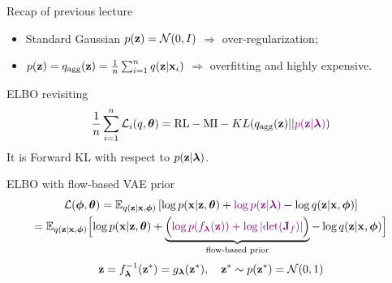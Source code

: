 \begin{frame}{Recap of previous lecture}
	\begin{itemize}
		\item Standard Gaussian $p(\mathbf{z}) = \mathcal{N}(0, I)$ $\Rightarrow$ over-regularization;
		\item $p(\mathbf{z}) = q_{\text{agg}}(\mathbf{z}) = \frac{1}{n}\sum_{i=1}^n q(\mathbf{z} | \mathbf{x}_i)$ $\Rightarrow$ overfitting and highly expensive.
	\end{itemize}
	\begin{block}{ELBO revisiting}
		\vspace{-0.4cm}
		\[
		\frac{1}{n}\sum_{i=1}^n \mathcal{L}_i(q, \boldsymbol{\theta}) = \text{RL} - \text{MI} -  KL(q_{\text{agg}}(\mathbf{z}) || {\color{violet}p(\mathbf{z} | \boldsymbol{\lambda})})
		\]
		It is Forward KL with respect to $p(\mathbf{z} | \boldsymbol{\lambda})$.
	\end{block}
	\begin{block}{ELBO with flow-based VAE prior}
		\vspace{-0.6cm}
		{\small
			\begin{multline*}
				\mathcal{L}(\boldsymbol{\phi}, \boldsymbol{\theta}) = \mathbb{E}_{q(\mathbf{z} | \mathbf{x}, \boldsymbol{\phi})} \left[ \log p(\mathbf{x} | \mathbf{z}, \boldsymbol{\theta}) + {\color{violet}\log p(\mathbf{z} | \boldsymbol{\lambda})} - \log q(\mathbf{z} | \mathbf{x}, \boldsymbol{\phi}) \right] \\
				= \mathbb{E}_{q(\mathbf{z} | \mathbf{x}, \boldsymbol{\phi})} \Bigl[ \log p(\mathbf{x} | \mathbf{z}, \boldsymbol{\theta}) + \underbrace{ \Bigl({\color{violet} \log p(f_{\boldsymbol{\lambda}}(\mathbf{z})) + \log \left| \det (\mathbf{J}_f) \right|} \Bigr) }_{\text{flow-based prior}} - \log q(\mathbf{z} | \mathbf{x}, \boldsymbol{\phi}) \Bigr] 
			\end{multline*}
		}
		\vspace{-0.5cm}
		\[
			\mathbf{z} = f^{-1}_{\boldsymbol{\lambda}}(\mathbf{z}^*) = g_{\boldsymbol{\lambda}}(\mathbf{z}^*), \quad \mathbf{z}^* \sim p(\mathbf{z}^*) = \mathcal{N}(0, 1)
		\]
	\end{block}
	\vspace{-0.5cm}
\end{frame}
